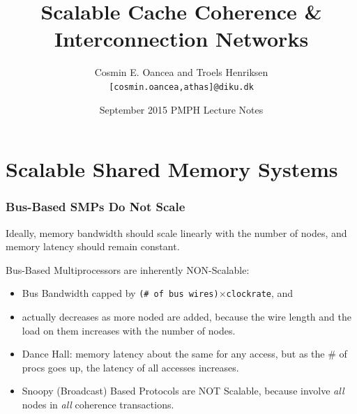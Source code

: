 \documentclass{beamer}
\title[Interconnect]{Scalable Cache Coherence \&\\Interconnection Networks}
\author[C.~Oancea]{Cosmin E. Oancea and Troels Henriksen\\{\tt [cosmin.oancea,athas]@diku.dk}}
\institute{Department of Computer Science (DIKU)\\University of Copenhagen}
\date[Sept 2015]{September 2015 PMPH Lecture Notes}
\renewcommand{\emph}[1]{\textcolor{structure}{#1}}
\newcommand{\emp}[1]{\textcolor{DikuRed}{ #1}}
\begin{document}
\titleslide




\begin{frame}[fragile]
	\tableofcontents
\end{frame}


\section{Scalable Shared Memory Systems}

\begin{frame}[fragile,t]
\frametitle{Bus-Based SMPs Do Not Scale}

\emph{Ideally, memory bandwidth should scale linearly with the number of nodes,
and memory latency should remain constant}.\bigskip

\alert{Bus-Based Multiprocessors are inherently NON-Scalable}:\medskip
\begin{itemize}
    \item \emp{Bus Bandwidth} capped by {\tt (\# of bus wires)$\times$clockrate}, and
    \item \emp{actually decreases as more noded are added}, 
            because the wire length and the load on them 
            increases with the number of nodes.\bigskip
    \item Dance Hall: memory latency about the same for any access,
            but as the \# of procs goes up, the latency of all
            accesses increases.\bigskip
    \item \emp{Snoopy (Broadcast) Based Protocols are NOT Scalable},
            because involve {\em all} nodes in {\em all} coherence transactions. 
\end  {itemize}
\end{frame}
\end{document}
